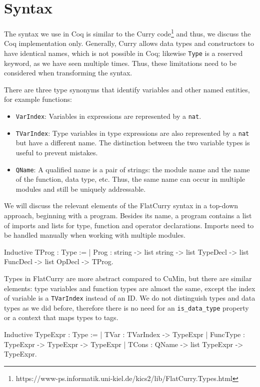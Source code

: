 \documentclass[paper = a4, fleqn, abstract=on, twoside]{scrreprt}
\newcommand{\coqinline}[1]{\texttt{#1}}
\begin{document}
\section{Syntax}
\label{flatcurrysyntax}
The syntax we use in Coq is similar to the Curry code\footnote{https://www-ps.informatik.uni-kiel.de/kics2/lib/FlatCurry.Types.html} and thus, we discuss the Coq implementation only. Generally, Curry allows data types and constructors to have identical names, which is not possible in Coq; likewise \texttt{Type} is a reserved keyword, as we have seen multiple times. Thus, these limitations need to be considered when transforming the syntax.
\par \noindent
There are three type synonyms that identify variables and other named entities, for example functions:
\begin{itemize}
	\item \coqinline{VarIndex}: Variables in expressions are represented by a \coqinline{nat}.
	\item \coqinline{TVarIndex}: Type variables in type expressions are also represented by a \coqinline{nat} but have a different name. The distinction between the two variable types is useful to prevent mistakes.
	\item \coqinline{QName}: A qualified name is a pair of strings: the module name and the name of the function, data type, etc. Thus, the same name can occur in multiple modules and still be uniquely addressable.
\end{itemize}
We will discuss the relevant elements of the FlatCurry syntax in a top-down approach, beginning with a program. Besides its name, a program contains a list of imports and lists for type, function and operator declarations. Imports need to be handled manually when working with multiple modules.
\begin{coqcode}
Inductive TProg : Type := 
  | Prog : string -> list string ->
           list TypeDecl -> list FuncDecl -> list OpDecl -> TProg.
\end{coqcode}
Types in FlatCurry are more abstract compared to CuMin, but there are similar elements: type variables and function types are almost the same, except the index of variable is a \texttt{TVarIndex} instead of an ID. We do not distinguish types and data types as we did before, therefore there is no need for an \texttt{is\_data\_type} property or a context that maps types to tags.
\begin{coqcode}
Inductive TypeExpr : Type :=
  | TVar     : TVarIndex -> TypeExpr
  | FuncType : TypeExpr  -> TypeExpr      -> TypeExpr
  | TCons    : QName     -> list TypeExpr -> TypeExpr.
\end{coqcode}
\end{document}
